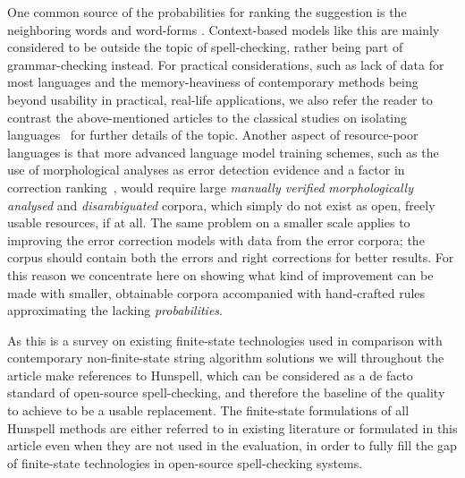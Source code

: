 \documentclass[a4paper,12pt]{article}
\begin{document}
One common source of the probabilities for ranking the suggestion is the
neighboring words and word-forms \cite[]{pirinen2012improving,otero/2007}. 
Context-based models like this are mainly considered to be outside the topic of
spell-checking, rather being part of grammar-checking instead. For practical
considerations, such as lack of data for most languages and the
memory-heaviness of contemporary methods being beyond usability in
practical, real-life applications, we also refer the reader to contrast
the above-mentioned articles to the classical studies on isolating
languages~\cite[]{mays/1991,wilcoxohearn2008realword} for further details
of the topic.
Another aspect of resource-poor languages is that more advanced language model
training schemes, such as the use of morphological analyses as error detection
evidence \cite[]{mays/1991} and a factor in correction
ranking~\cite[]{otero/2007}, would require large \emph{manually verified}
\emph{morphologically analysed} and \emph{disambiguated} corpora, which simply
do not exist as open, freely usable resources, if at all. The same problem on a
smaller scale applies to improving the error correction models with data from
the error corpora; the corpus should contain both the errors and right
corrections for better results. For this reason we concentrate here on showing
what kind of improvement can be made with smaller, obtainable corpora
accompanied with hand-crafted rules approximating the lacking
\emph{probabilities}.

As this is a survey on existing finite-state technologies used in comparison
with contemporary non-finite-state string algorithm solutions we will throughout
the article make references to Hunspell, which can be considered as a de facto
standard of open-source spell-checking, and therefore the baseline of the
quality to achieve to be a usable replacement. The finite-state formulations of
all Hunspell methods are either referred to in existing literature or
formulated in this article even when they are not used in the evaluation, in
order to fully fill the gap of finite-state technologies in open-source
spell-checking systems.
\end{document}

